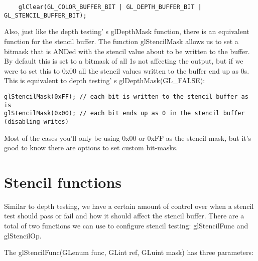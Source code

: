 \documentclass{article}
\begin{document}
\begin{lstlisting}
    glClear(GL_COLOR_BUFFER_BIT | GL_DEPTH_BUFFER_BIT | GL_STENCIL_BUFFER_BIT); 
\end{lstlisting}

Also, just like the depth testing' s glDepthMask function, there is an equivalent function for the stencil buffer. The function glStencilMask allows us to set a bitmask that is ANDed with the stencil value about to be written to the buffer. By default this is set to a bitmask of all 1s not affecting the output, but if we were to set this to 0x00 all the stencil values written to the buffer end up as 0s. This is equivalent to depth testing' s glDepthMask(GL\_FALSE):

\begin{lstlisting}
glStencilMask(0xFF); // each bit is written to the stencil buffer as is
glStencilMask(0x00); // each bit ends up as 0 in the stencil buffer (disabling writes)
\end{lstlisting}

Most of the cases you'll only be using 0x00 or 0xFF as the stencil mask, but it's good to know there are options to set custom bit-masks.

\section{Stencil functions}

Similar to depth testing, we have a certain amount of control over when a stencil test should pass or fail and how it should affect the stencil buffer. There are a total of two functions we can use to configure stencil testing: glStencilFunc and glStencilOp.

The glStencilFunc(GLenum func, GLint ref, GLuint mask) has three parameters:
\end{document}

